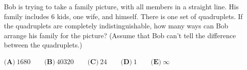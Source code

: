 Bob is trying to take a family picture, with all members in a straight line. His family includes $6$ kids, one wife, and himself. There is one set of quadruplets. If the quadruplets are completely indistinguishable, how many ways can Bob arrange his family for the picture? (Assume that Bob can't tell the difference between the quadruplets.)

$\textbf{(A)}~1680\qquad\textbf{(B)}~40320\qquad\textbf{(C)}~24\qquad\textbf{(D)}~1\qquad\textbf{(E)}~\infty\qquad$
